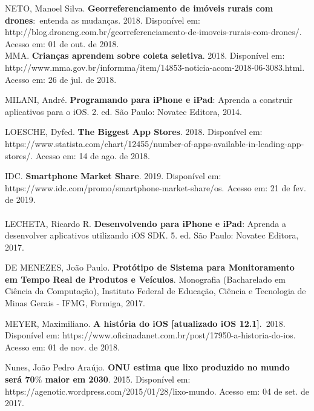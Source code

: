 NETO, Manoel Silva. \textbf{Georreferenciamento de imóveis rurais com drones}:\ entenda as mudanças. 2018. Disponível em: http://blog.droneng.com.br/georreferenciamento-de-imoveis-rurais-com-drones/. Acesso em: 01 de out. de 2018.  \\




MMA. \textbf{Crianças aprendem sobre coleta seletiva}. 2018. Disponível em: http://www.mma.gov.br/informma/item/14853-noticia-acom-2018-06-3083.html. Acesso em: 26 de jul. de 2018.


MILANI, André. \textbf{Programando para iPhone e iPad}: Aprenda a construir aplicativos para o iOS. 2. ed. São Paulo: Novatec Editora, 2014.





LOESCHE, Dyfed. \textbf{The Biggest App Stores}. 2018. Disponível em: https://www.statista.com/chart/12455/number-of-apps-available-in-leading-app-stores/. Acesso em: 14 de ago. de 2018.





IDC. \textbf{Smartphone Market Share}. 2019. Disponível em: https://www.idc.com/promo/smartphone-market-share/os. Acesso em: 21 de fev. de 2019.\\
 \\

LECHETA, Ricardo R. \textbf{Desenvolvendo para iPhone e iPad}: Aprenda a desenvolver aplicativos utilizando iOS SDK. 5. ed. São Paulo: Novatec Editora, 2017.




DE MENEZES, João Paulo. \textbf{Protótipo de Sistema para Monitoramento em Tempo Real de Produtos e Veículos}. Monografia (Bacharelado em Ciência da Computação), Instituto Federal de Educação, Ciência e Tecnologia de Minas Gerais - IFMG, Formiga, 2017. 





MEYER, Maximiliano. \textbf{A história do iOS [atualizado iOS 12.1]}.\ 2018.  Disponível em: https://www.oficinadanet.com.br/post/17950-a-historia-do-ios. Acesso em: 01 de nov. de 2018.



Nunes, João Pedro Araújo. \textbf{ONU estima que lixo produzido no mundo será 70$\%$  maior em 2030}. 2015. Disponível em: https://agenotic.wordpress.com/2015/01/28/lixo-mundo. Acesso em: 04 de set. de 2017.\\

